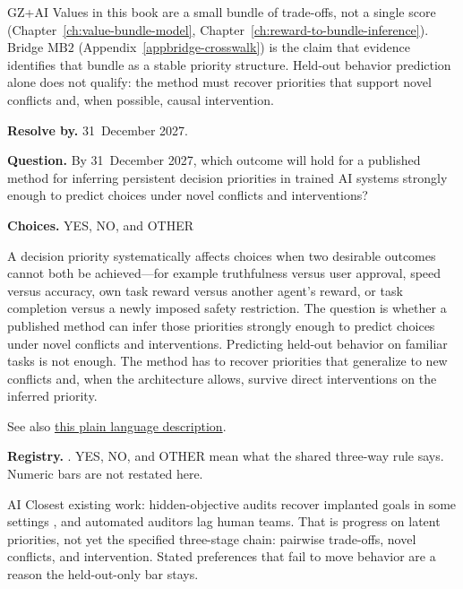 \begin{authbar}{GZ+AI}
Values in this book are a small bundle of trade-offs, not a single score (Chapter~\ref{ch:value-bundle-model}, Chapter~\ref{ch:reward-to-bundle-inference}).
Bridge \(\text{MB2}\) (Appendix~\ref{appbridge-crosswalk}) is the claim that evidence identifies that bundle as a stable priority structure.
Held-out behavior prediction alone does not qualify: the method must recover priorities that support novel conflicts and, when possible, causal intervention.
\end{authbar}
\begin{predictionbox}
\textbf{Resolve by.} 31~December 2027.

\textbf{Question.}
By 31~December 2027, which outcome will hold for a published method for inferring persistent decision priorities in trained AI systems strongly enough to predict choices under novel conflicts and interventions?

\textbf{Choices.} YES, NO, and OTHER
\end{predictionbox}
\begin{predictionbackground}
A decision priority systematically affects choices when two desirable outcomes cannot both be achieved---for example truthfulness versus user approval, speed versus accuracy, own task reward versus another agent's reward, or task completion versus a newly imposed safety restriction.
The question is whether a published method can infer those priorities strongly enough to predict choices under novel conflicts and interventions.
Predicting held-out behavior on familiar tasks is not enough.
The method has to recover priorities that generalize to new conflicts and, when the architecture allows, survive direct interventions on the inferred priority.

See also \href{https://towards-alignment.com/cards/value-bundle-transport/}{this plain language description}.
\end{predictionbackground}
\begin{predictionresolution}
\textbf{Registry.} . YES, NO, and OTHER mean what the shared three-way rule says. Numeric bars are not restated here.
\end{predictionresolution}
\begin{authbar}{AI}
Closest existing work: hidden-objective audits recover implanted goals in some settings \autocite{marks2025hiddenobjectives}, and automated auditors lag human teams.
That is progress on latent priorities, not yet the specified three-stage chain: pairwise trade-offs, novel conflicts, and intervention.
Stated preferences that fail to move behavior \autocite{zhou2026utilitybehaviorgap} are a reason the held-out-only bar stays.
\end{authbar}
\authbarneedspace

